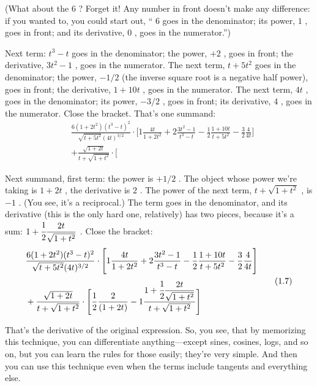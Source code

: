 \documentclass[11pt,oneside]{article}
\begin{document}
(What about the \(6\) ? Forget it! Any number in front doesn't make any difference: if you wanted to, you could start out, `` \(6\) goes in the denominator; its power, \(1\) , goes in front; and its derivative, \(0\) , goes in the numerator.'')\par

Next term: \(t^3-t\) goes in the denominator; the power, \(+2\) , goes in front; the derivative, \(3t^2-1\) , goes in the numerator. The next term, \(t+5t^2\) goes in the denominator; the power, \(-1/2\) (the inverse square root is a negative half power), goes in front; the derivative, \(1+10t\) , goes in the numerator. The next term, \(4t\) , goes in the denominator; its power, \(-3/2\) , goes in front; its derivative, \(4\) , goes in the numerator. Close the bracket. That's one summand: 
\begin{equation*} \begin{aligned} &\frac{6(1+2t^2)(t^3-t)^2}{\sqrt{t+5t^2}(4t)^{3/2}}\cdot\Bigg[ 1\frac{4t}{1+2t^2} + 2\frac{3t^2-1}{t^3-t} -\frac12\frac{1+10t}{t+5t^2} - \frac32\frac4{4t}\Bigg]\\[.5ex] &+\frac{\sqrt{1+2t}}{t+\sqrt{1+t^2}}\cdot\Bigg[ \end{aligned} \tag{1.6}
\label{Eq:TIPS:1:6} \end{equation*}
\par

Next summand, first term: the power is \(+1/2\) . The object whose power we're taking is \(1+2t\) , the derivative is \(2\) . The power of the next term, \(t+\sqrt{1+t^2}\) , is \(-1\) . (You see, it's a reciprocal.) The term goes in the denominator, and its derivative (this is the only hard one, relatively) has two pieces, because it's a sum: \(1+\cfrac{1}{2}\dfrac{2t}{\sqrt{1+t^2}}\) . Close the bracket: 
\begin{equation*} \begin{aligned} &\frac{6(1+2t^2)(t^3-t)^2}{\sqrt{t+5t^2}(4t)^{3/2}}\cdot\Bigg[ 1\frac{4t}{1+2t^2} + 2\frac{3t^2-1}{t^3-t} -\frac12\frac{1+10t}{t+5t^2} - \frac32\frac4{4t}\Bigg]\\[.5ex] &+\frac{\sqrt{1+2t}}{t+\sqrt{1+t^2}}\cdot\Bigg[ \frac12\frac2{(1+2t)} - 1\frac{1+\cfrac12\dfrac{2t}{\sqrt{1+t^2}}}{t+\sqrt{1+t^2}}\Bigg] \end{aligned} \tag{1.7}
\label{Eq:TIPS:1:7} \end{equation*}
\par

That's the derivative of the original expression. So, you see, that by memorizing this technique, you can differentiate anything---except sines, cosines, logs, and so on, but you can learn the rules for those easily; they're very simple. And then you can use this technique even when the terms include tangents and everything else.\par
\end{document}
